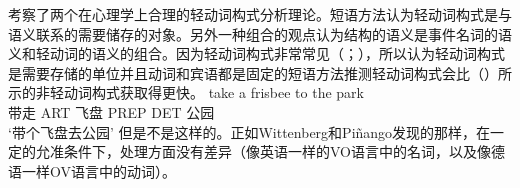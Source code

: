 \begin{exe}
\begin{xlist}[iv.]
\begin{exe}
\begin{xlist}[iv.]
\citet{WP2011a}考察了两个在心理学上合理的轻动词构式分析理论。短语方法认为轻动词构式是与语义联系的需要储存的对象\citep{Goldberg2003a}。另外一种组合的观点认为结构的语义是事件名词的语义和轻动词的语义的组合\citep{Grimshaw97a-u,Butt2003a-u,Jackendoff2002a-u,CJ2005a,MuellerPersian,BPW2008a-u}。因为轻动词构式非常常见（\citealp*{Pinango:2006qy}；\citealp[]{WP2011a}），所以认为轻动词构式是需要存储的单位并且动词和宾语都是固定的短语方法推测轻动词构式会比（）所示的非轻动词构式获取得更快\citep[]{WP2011a}。
\ea
\gll take a frisbee to the park\\
     带走 ART 飞盘 PREP DET 公园\\
\glt `带个飞盘去公园'
\z
但是不是这样的。正如Wittenberg和Piñango发现的那样，在一定的允准条件下，处理方面没有差异（像英语一样的VO语言中的名词，以及像德语一样OV语言中的动词）。


\end{xlist}
\end{exe}
\end{xlist}
\end{exe}
